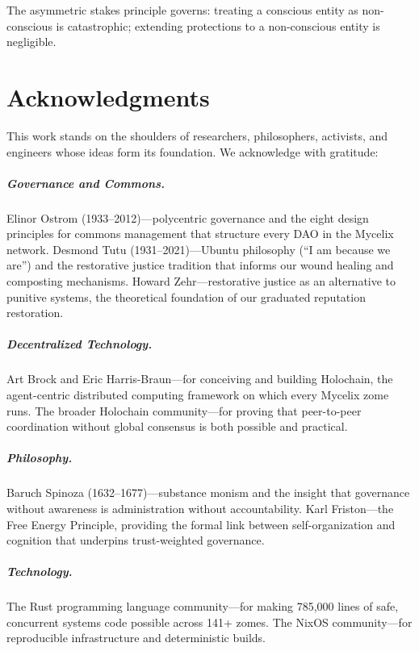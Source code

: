 \documentclass[12pt]{book}
\begin{document}
The asymmetric stakes principle governs: treating a conscious entity as
non-conscious is catastrophic; extending protections to a non-conscious entity
is negligible.


\backmatter

\chapter*{Acknowledgments}

This work stands on the shoulders of researchers, philosophers, activists, and
engineers whose ideas form its foundation. We acknowledge with gratitude:

\paragraph{Governance and Commons.}
Elinor Ostrom (1933--2012)---polycentric governance and the eight design principles
for commons management that structure every DAO in the Mycelix network.
Desmond Tutu (1931--2021)---Ubuntu philosophy (``I am because we are'') and the
restorative justice tradition that informs our wound healing and composting
mechanisms.
Howard Zehr---restorative justice as an alternative to punitive systems, the
theoretical foundation of our graduated reputation restoration.

\paragraph{Decentralized Technology.}
Art Brock and Eric Harris-Braun---for conceiving and building Holochain, the
agent-centric distributed computing framework on which every Mycelix zome runs.
The broader Holochain community---for proving that peer-to-peer coordination
without global consensus is both possible and practical.

\paragraph{Philosophy.}
Baruch Spinoza (1632--1677)---substance monism and the insight that governance
without awareness is administration without accountability.
Karl Friston---the Free Energy Principle, providing the formal link between
self-organization and cognition that underpins trust-weighted governance.

\paragraph{Technology.}
The Rust programming language community---for making 785,000 lines of safe,
concurrent systems code possible across 141+ zomes.
The NixOS community---for reproducible infrastructure and deterministic builds.
\end{document}
